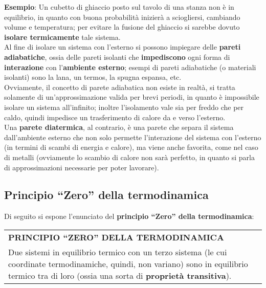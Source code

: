 \documentclass[a4paper]{extarticle}
\newcommand{\quotes}[1]{``#1''}
\renewcommand\arraystretch{}
\begin{document}
\vspace{1em}
\noindent
\textbf{Esempio}: Un cubetto di ghiaccio posto sul tavolo di una stanza non è in equilibrio, in quanto con buona probabilità inizierà a sciogliersi, cambiando volume e temperatura; per evitare la fusione del ghiaccio si sarebbe dovuto \textbf{isolare termicamente} tale sistema.\\
Al fine di isolare un sistema con l'esterno si possono impiegare delle \textbf{pareti adiabatiche}, ossia delle pareti isolanti che \textbf{impediscono} ogni forma di \textbf{interazione} con l'\textbf{ambiente esterno}; esempi di pareti adiabatiche (o materiali isolanti) sono la lana, un termos, la spugna espansa, etc.\\
Ovviamente, il concetto di parete adiabatica non esiste in realtà, si tratta solamente di un'approssimazione valida per brevi periodi, in quanto è impossibile isolare un sistema all'infinito; inoltre l'isolamento vale sia per freddo che per caldo, quindi impedisce un trasferimento di calore da e verso l'esterno.\\
Una \textbf{parete diatermica}, al contrario, è una parete che separa il sistema dall'ambiente esterno che non solo permette l'interazione del sistema con l'esterno (in termini di scambi di energia e calore), ma viene anche favorita, come nel caso di metalli (ovviamente lo scambio di calore non sarà perfetto, in quanto si parla di approssimazioni necessarie per poter lavorare).

\vspace{1em}
\noindent
\subsection{Principio \quotes{Zero} della termodinamica}
Di seguito si espone l'enunciato del \textbf{principio \quotes{Zero} della termodinamica}:

\vspace{1em}
\setlength{\tabcolsep}{14pt}
\renewcommand{\arraystretch}{2}
\noindent
\begin{tabularx}{\textwidth}{@{}|P|@{}}
    \hline
    {\textbf{PRINCIPIO \quotes{ZERO} DELLA TERMODINAMICA}}\\
    \parbox{\linewidth}{Due sistemi in equilibrio termico con un terzo sistema (le cui coordinate termodinamiche, quindi, non variano) sono in equilibrio termico tra di loro (ossia una sorta di \textbf{proprietà transitiva}).\vspace{3mm}}\\
    \hline
\end{tabularx}
\end{document}

